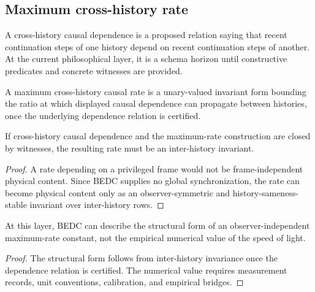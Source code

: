 \subsection{Maximum cross-history rate}
\label{subsec:philosophy-maximum-cross-history-rate}

\begin{definition}
\label{def:philosophy-cross-history-causal-dependence}
A cross-history causal dependence is a proposed relation saying that
recent continuation steps of one history depend on recent continuation
steps of another. At the current philosophical layer, it is a schema
horizon until constructive predicates and concrete witnesses are
provided.
\end{definition}

\begin{definition}
\label{def:philosophy-maximum-cross-history-causal-rate}
A maximum cross-history causal rate is a unary-valued invariant form
bounding the ratio at which displayed causal dependence can propagate
between histories, once the underlying dependence relation is
certified.
\end{definition}

\begin{theorem}
\label{thm:philosophy-maximum-rate-invariant-after-witnesses}
If cross-history causal dependence and the maximum-rate construction
are closed by witnesses, the resulting rate must be an inter-history
invariant.
\end{theorem}
\begin{proof}
A rate depending on a privileged frame would not be frame-independent
physical content. Since BEDC supplies no global synchronization, the
rate can become physical content only as an observer-symmetric and
history-sameness-stable invariant over inter-history rows.
\end{proof}

\begin{corollary}
\label{cor:philosophy-light-speed-form-structural-skeleton}
At this layer, BEDC can describe the structural form of an
observer-independent maximum-rate constant, not the empirical numerical
value of the speed of light.
\end{corollary}
\begin{proof}
The structural form follows from inter-history invariance once the
dependence relation is certified. The numerical value requires
measurement records, unit conventions, calibration, and empirical
bridges.
\end{proof}

